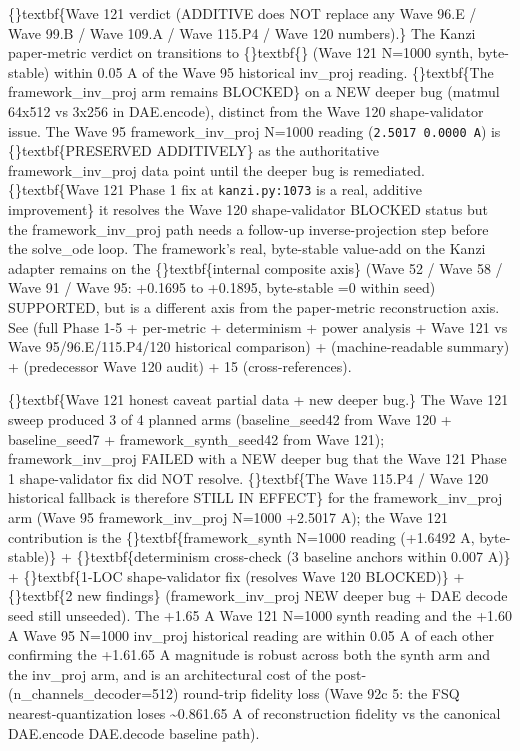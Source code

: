 \documentclass{article}
\begin{document}
\{\}textbf\{Wave 121 verdict (ADDITIVE  does NOT replace any Wave 96.E / Wave 99.B / Wave 109.A / Wave 115.P4 / Wave 120 numbers).\} The Kanzi paper-metric verdict on  transitions to \{\}textbf\{\} (Wave 121 N=1000 synth, byte-stable)  within 0.05 A of the Wave 95 historical  inv\_proj reading. \{\}textbf\{The framework\_inv\_proj arm remains BLOCKED\} on a NEW deeper bug (matmul 64x512 vs 3x256 in DAE.encode), distinct from the Wave 120 shape-validator issue. The Wave 95 framework\_inv\_proj N=1000 reading (\texttt{2.5017  0.0000 A}) is \{\}textbf\{PRESERVED ADDITIVELY\} as the authoritative framework\_inv\_proj data point until the deeper bug is remediated. \{\}textbf\{Wave 121 Phase 1 fix at \texttt{kanzi.py:1073} is a real, additive improvement\}  it resolves the Wave 120 shape-validator BLOCKED status  but the framework\_inv\_proj path needs a follow-up inverse-projection step before the solve\_ode loop. The framework's real, byte-stable value-add on the Kanzi adapter remains on the \{\}textbf\{internal composite axis\} (Wave 52 / Wave 58 / Wave 91 / Wave 95: +0.1695 to +0.1895, byte-stable =0 within seed)  SUPPORTED, but is a different axis from the paper-metric reconstruction axis. See  (full Phase 1-5 + per-metric  + determinism + power analysis + Wave 121 vs Wave 95/96.E/115.P4/120 historical comparison) +  (machine-readable summary) +  (predecessor Wave 120 audit) +  15 (cross-references).

\{\}textbf\{Wave 121 honest caveat  partial data + new deeper bug.\} The Wave 121 sweep produced 3 of 4 planned arms (baseline\_seed42 from Wave 120 + baseline\_seed7 + framework\_synth\_seed42 from Wave 121); framework\_inv\_proj FAILED with a NEW deeper bug that the Wave 121 Phase 1 shape-validator fix did NOT resolve. \{\}textbf\{The Wave 115.P4 / Wave 120 historical fallback is therefore STILL IN EFFECT\} for the framework\_inv\_proj arm (Wave 95 framework\_inv\_proj N=1000 +2.5017 A); the Wave 121 contribution is the \{\}textbf\{framework\_synth N=1000 reading (+1.6492 A, byte-stable)\} + \{\}textbf\{determinism cross-check (3 baseline anchors within 0.007 A)\} + \{\}textbf\{1-LOC shape-validator fix (resolves Wave 120 BLOCKED)\} + \{\}textbf\{2 new findings\} (framework\_inv\_proj NEW deeper bug + DAE decode seed still unseeded). The +1.65 A Wave 121 N=1000 synth reading and the +1.60 A Wave 95 N=1000 inv\_proj historical reading are within 0.05 A of each other  confirming the +1.61.65 A magnitude is robust across both the synth arm and the inv\_proj arm, and is an architectural cost of the post- (n\_channels\_decoder=512) round-trip fidelity loss (Wave 92c 5: the FSQ nearest-quantization loses \textasciitilde{}0.861.65 A of reconstruction fidelity vs the canonical DAE.encode  DAE.decode baseline path).
\end{document}
